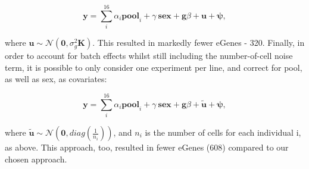 \begin{equation}\label{eq:neuroseq_batch_kinship}
    \mathbf{y} = \sum_i^{16}\alpha_i \mathbf{pool}_i + 
    \gamma \ \mathbf{sex} + 
    \mathbf{g}\beta + \mathbf{u} + \boldsymbol{\psi}, 
\end{equation}

where $ \mathbf{u} \sim \mathcal{N}(\mathbf{0},\sigma_g^2\mathbf{K})$.
This resulted in markedly fewer eGenes - 320.
Finally, in order to account for batch effects whilst still including the number-of-cell noise term, it is possible to only consider one experiment per line, and correct for pool, as well as sex, as covariates:

\begin{equation}\label{eq:neuroseq_batch_ncell}
    \mathbf{y} = \sum_i^{16}\alpha_i \mathbf{pool}_i + \gamma \ \mathbf{sex} + \mathbf{g}\beta + \tilde{\mathbf{u}} + \boldsymbol{\psi}, 
\end{equation}

where $\tilde{\mathbf{u}} \sim \mathcal{N}(\mathbf{0}, diag(\frac{1}{n_i}))$, and $n_i$ is the number of cells for each individual i, as above.
This approach, too, resulted in fewer eGenes (608) compared to our chosen approach.

